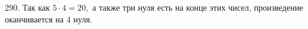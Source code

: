 290. Так как $5\cdot4=20,$ а также три нуля есть на конце этих чисел, произведение оканчивается на 4 нуля.\\
